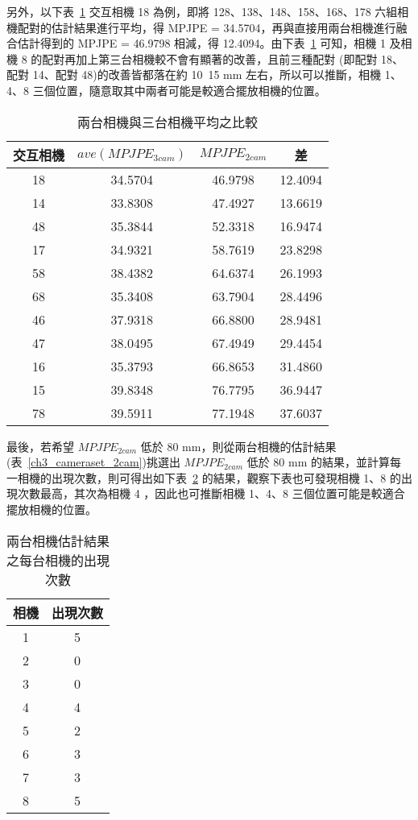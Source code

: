另外，以下表~\ref{ch3_ave_3cam_vs_2cam} 交互相機 18 為例，即將 128、138、148、158、168、178 六組相機配對的估計結果進行平均，得 MPJPE = 34.5704，再與直接用兩台相機進行融合估計得到的 MPJPE = 46.9798 相減，得 12.4094。由下表~\ref{ch3_ave_3cam_vs_2cam} 可知，相機 1 及相機 8 的配對再加上第三台相機較不會有顯著的改善，且前三種配對 (即配對 18、配對 14、配對 48)的改善皆都落在約 10~15 mm 左右，所以可以推斷，相機 1、4、8 三個位置，隨意取其中兩者可能是較適合擺放相機的位置。

\begin{table}[!ht]
   \caption[兩台相機與三台相機平均之比較]{兩台相機與三台相機平均之比較}
   \centering
   \label{ch3_ave_3cam_vs_2cam}
   \setlength{\tabcolsep}{3pt}
   \renewcommand\arraystretch{1.5}
   \begin{tabular}{c|c|c|c}
      交互相機 & $ave(MPJPE_{3 cam})$ & $MPJPE_{2 cam}$ & 差 \\
      \midrule[2pt]
      18 & 34.5704 & 46.9798 & 12.4094 \\
      14 & 33.8308 & 47.4927 & 13.6619 \\
      48 & 35.3844 & 52.3318 & 16.9474 \\
      17 & 34.9321 & 58.7619 & 23.8298 \\ 
      58 & 38.4382 & 64.6374 & 26.1993 \\
      68 & 35.3408 & 63.7904 & 28.4496 \\
      46 & 37.9318 & 66.8800 & 28.9481 \\  
      47 & 38.0495 & 67.4949 & 29.4454 \\ 
      16 & 35.3793 & 66.8653 & 31.4860 \\ 
      15 & 39.8348 & 76.7795 & 36.9447 \\
      78 & 39.5911 & 77.1948 & 37.6037 \\
   \end{tabular}
\end{table}

最後，若希望 $MPJPE_{2 cam}$ 低於 80 mm，則從兩台相機的估計結果(表~\ref{ch3_cameraset_2cam})挑選出 $MPJPE_{2 cam}$ 低於 80 mm 的結果，並計算每一相機的出現次數，則可得出如下表~\ref{ch3_cam_occurrence} 的結果，觀察下表也可發現相機 1、8 的出現次數最高，其次為相機 4 ，因此也可推斷相機 1、4、8 三個位置可能是較適合擺放相機的位置。

\begin{table}[!ht]
   \caption[兩台相機估計結果之每台相機的出現次數]{兩台相機估計結果之每台相機的出現次數}
   \centering
   \label{ch3_cam_occurrence}
   \setlength{\tabcolsep}{3pt}
   \renewcommand\arraystretch{1.5}
   \begin{tabular}{c|c}
      相機 & 出現次數 \\
      \midrule[2pt]
      1 & 5 \\
      2 & 0 \\
      3 & 0 \\
      4 & 4 \\
      5 & 2 \\
      6 & 3 \\
      7 & 3 \\
      8 & 5 \\
   \end{tabular}
\end{table}

